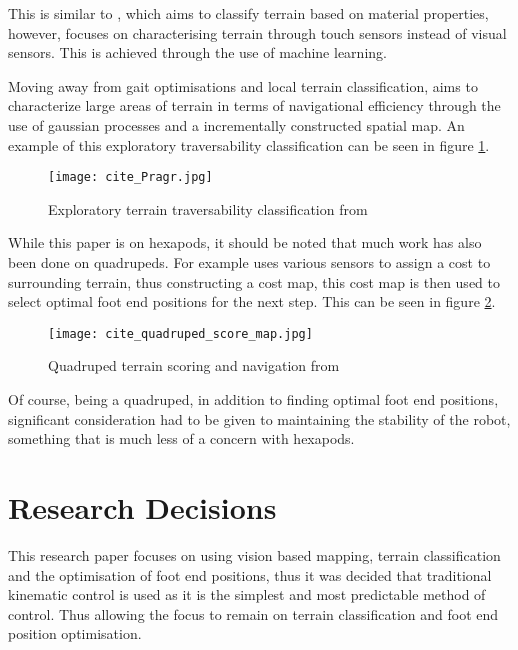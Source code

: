     This is similar to \cite{Xu2023Learning}, which aims to
    classify terrain based on material properties, however, \cite{Xu2023Learning} focuses on characterising terrain through touch sensors instead of visual sensors.
    This is achieved through the use of machine learning.
    
    Moving away from gait optimisations and local terrain classification, \cite{Prágr2019Online} aims to characterize
    large areas of terrain in terms of navigational efficiency through the use of gaussian processes and a incrementally constructed spatial map.
    An example of this exploratory traversability classification can be seen in figure \ref{fig:cite_pragr}.
    \begin{figure}[h]
        \centering
        \texttt{[image: cite\_Pragr.jpg]}
        \caption{Exploratory terrain traversability classification from \citep{Prágr2019Online}}
        \label{fig:cite_pragr}
    \end{figure}

    \newpage
    \noindent
    While this paper is on hexapods, it should be noted that much work has also been done on quadrupeds. For example \cite{Mastalli2020Motion} uses various sensors
    to assign a cost to surrounding terrain, thus constructing a cost map, this cost map is then used to select optimal foot end positions for the next step. This can be seen in
    figure \ref{fig:cite_quadruped_walk}.
    \begin{figure}[h]
        \centering
        \texttt{[image: cite\_quadruped\_score\_map.jpg]}
        \caption{Quadruped terrain scoring and navigation from \citep{Mastalli2020Motion}}
        \label{fig:cite_quadruped_walk}
    \end{figure}
    Of course, being a quadruped, in addition to finding optimal foot end positions, significant consideration had to be given to maintaining the stability of the robot,
    something that is much less of a concern with hexapods.

\section{Research Decisions}
    This research paper focuses on using vision based mapping, terrain classification and the optimisation of foot end positions, thus it was decided that
    traditional kinematic control is used as it is the simplest and most predictable method of control. Thus allowing the focus to remain on terrain
    classification and foot end position optimisation.

